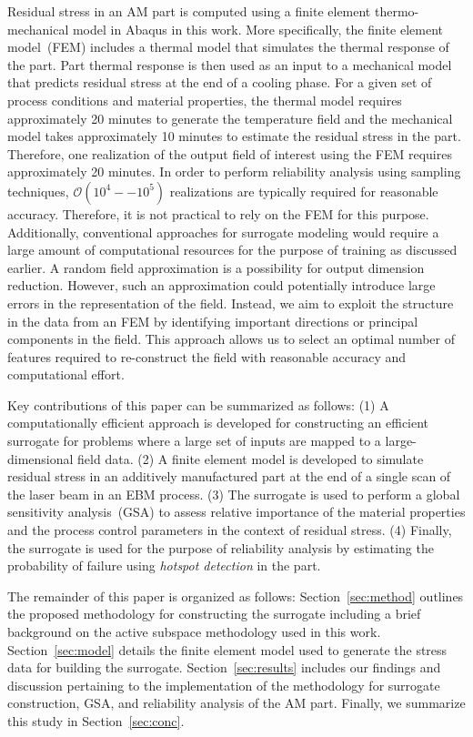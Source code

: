 Residual stress in an AM part is computed using a finite element thermo-mechanical model in Abaqus in this work. 
More specifically, the finite element model~(FEM) includes a thermal model that simulates the thermal response of the
part. Part thermal response is then used as an input to a mechanical model that predicts residual stress at the end
of a cooling phase. For a given set of process conditions and material properties, the thermal model requires
approximately 20 minutes to generate the temperature field and the mechanical model takes approximately 10
minutes to estimate the residual stress in the part. Therefore, one realization of the output field of interest
using the FEM requires approximately 20 minutes. In order to perform reliability analysis using
sampling techniques, $\mathcal{O}(10^4--10^5)$ realizations are typically required for reasonable accuracy.  
Therefore, it is not practical
to rely on the FEM for this purpose. Additionally, conventional approaches for surrogate
modeling would require a large amount of computational resources for the purpose of training as discussed earlier.
 A random field approximation is a possibility for
output dimension reduction. However, such an approximation could potentially introduce large errors in the  
representation of the field. Instead, we aim to exploit the structure in the data from an FEM by identifying important 
directions or principal components in the field. This approach allows us to select an optimal number of 
features required to re-construct the field with reasonable accuracy and computational effort. 

Key contributions of this paper can be summarized as follows: (1) A computationally efficient approach is developed
for constructing an efficient surrogate for problems where a large set of inputs are mapped to a large-dimensional
field data. (2) A finite element model is developed to simulate residual stress in an additively manufactured part
at the end of a single scan of the laser beam in an EBM process. (3) The surrogate is used to perform a global
sensitivity analysis~(GSA) to assess relative importance of the material properties and the process control parameters
in the context of residual stress. (4) Finally, the surrogate is used for the purpose of reliability analysis by estimating the
probability of failure using \textit{hotspot detection} in the part. 

The remainder of this paper is organized as follows: Section~\ref{sec:method} outlines the proposed methodology for
constructing the surrogate including a brief background on the active subspace methodology used in this work.
Section~\ref{sec:model} details the finite element model used to generate the stress data for building the surrogate.
Section~\ref{sec:results} includes our findings and discussion pertaining to the implementation of the methodology 
for surrogate construction, GSA, and reliability analysis of the AM part. 
Finally, we summarize this study in Section~\ref{sec:conc}. 



